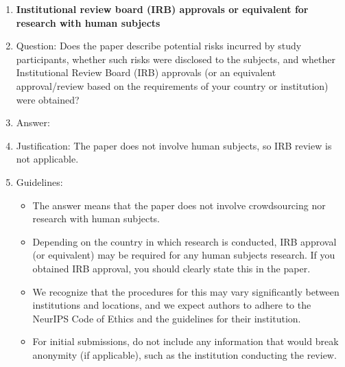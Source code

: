 \begin{enumerate}
\item \textbf{Institutional review board (IRB) approvals or equivalent for research with human subjects}
    \item[] Question: Does the paper describe potential risks incurred by study participants, whether such risks were disclosed to the subjects, and whether Institutional Review Board (IRB) approvals (or an equivalent approval/review based on the requirements of your country or institution) were obtained?
    \item[] Answer: \answerNA{}
    \item[] Justification: The paper does not involve human subjects, so IRB review is not applicable.
    \item[] Guidelines:
    \begin{itemize}
        \item The answer \answerNA{} means that the paper does not involve crowdsourcing nor research with human subjects.
        \item Depending on the country in which research is conducted, IRB approval (or equivalent) may be required for any human subjects research. If you obtained IRB approval, you should clearly state this in the paper.
        \item We recognize that the procedures for this may vary significantly between institutions and locations, and we expect authors to adhere to the NeurIPS Code of Ethics and the guidelines for their institution.
        \item For initial submissions, do not include any information that would break anonymity (if applicable), such as the institution conducting the review.
    \end{itemize}


\end{enumerate}
